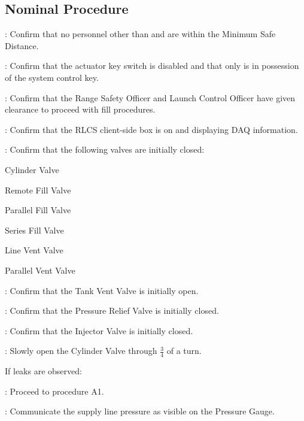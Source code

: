 \subsection{Nominal Procedure}
\begin{checklist}
    \item \secondary: Confirm that no personnel other than \primary{} and \secondary{} are within the Minimum Safe Distance.
    \item \ops: Confirm that the actuator key switch is disabled and that only \ops{} is in possession of the system control  key.
    \item \ops: Confirm that the Range Safety Officer and Launch Control Officer have given clearance to proceed with fill procedures.
    \item \control: Confirm that the RLCS client-side box is on and displaying DAQ information.
    \item \primary{}: Confirm that the following valves are initially closed:
    \begin{checklist}
        \item Cylinder Valve
        \item Remote Fill Valve
        \item Parallel Fill Valve
        \item Series Fill Valve
        \item Line Vent Valve
        \item Parallel Vent Valve
    \end{checklist}
    \item \ops{}: Confirm that the Tank Vent Valve is initially open.
    \item \ops{}: Confirm that the Pressure Relief Valve is initially closed.
    \item \ops{}: Confirm that the Injector Valve is initially closed.
    \item \primary: Slowly open the Cylinder Valve through $\frac{3}{4}$ of a turn.
    \begin{checklist}[label=$\bullet$]
        \item If leaks are observed:
        \begin{checklist}
            \item \ops{}: Proceed to procedure A1.
        \end{checklist}
    \end{checklist}
    \item \primary{}: Communicate the supply line pressure as visible on the Pressure Gauge.

\end{checklist}
